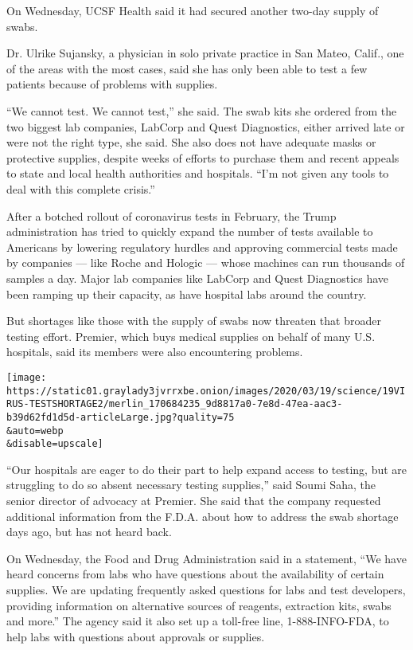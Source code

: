On Wednesday, UCSF Health said it had secured another two-day supply of
swabs.

Dr. Ulrike Sujansky, a physician in solo private practice in San Mateo,
Calif., one of the areas with the most cases, said she has only been
able to test a few patients because of problems with supplies.

``We cannot test. We cannot test,'' she said. The swab kits she ordered
from the two biggest lab companies, LabCorp and Quest Diagnostics,
either arrived late or were not the right type, she said. She also does
not have adequate masks or protective supplies, despite weeks of efforts
to purchase them and recent appeals to state and local health
authorities and hospitals. ``I'm not given any tools to deal with this
complete crisis.''

After a botched rollout of coronavirus tests in February, the Trump
administration has tried to quickly expand the number of tests available
to Americans by lowering regulatory hurdles and approving commercial
tests made by companies --- like Roche and Hologic --- whose machines
can run thousands of samples a day. Major lab companies like LabCorp and
Quest Diagnostics have been ramping up their capacity, as have hospital
labs around the country.

But shortages like those with the supply of swabs now threaten that
broader testing effort. Premier, which buys medical supplies on behalf
of many U.S. hospitals, said its members were also encountering
problems.

\texttt{[image: https://static01.graylady3jvrrxbe.onion/images/2020/03/19/science/19VIRUS-TESTSHORTAGE2/merlin\_170684235\_9d8817a0-7e8d-47ea-aac3-b39d62fd1d5d-articleLarge.jpg?quality=75\\\&auto=webp\\\&disable=upscale]}

``Our hospitals are eager to do their part to help expand access to
testing, but are struggling to do so absent necessary testing
supplies,'' said Soumi Saha, the senior director of advocacy at Premier.
She said that the company requested additional information from the
F.D.A. about how to address the swab shortage days ago, but has not
heard back.

On Wednesday, the Food and Drug Administration said in a statement, ``We
have heard concerns from labs who have questions about the availability
of certain supplies. We are updating frequently asked questions for labs
and test developers, providing information on alternative sources of
reagents, extraction kits, swabs and more.'' The agency said it also set
up a toll-free line, 1-888-INFO-FDA, to help labs with questions about
approvals or supplies.

